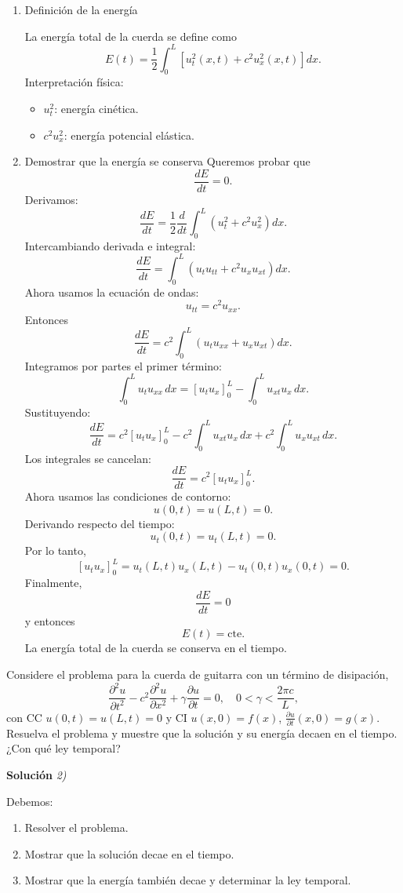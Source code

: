 \documentclass[11pt,spanish]{article}
\newcounter{problema}
\newcommand{\prob}{\stepcounter{problema} \vspace{.5cm} \noindent{\bf Problema \arabic{problema}: }}
\begin{document}
\begin{enumerate}
\item Definición de la energía

La energía total de la cuerda se define como
$$
E(t)
=
\frac12
\int_0^L
\left[
u_t^2(x,t)
+
c^2 u_x^2(x,t)
\right]
dx.
$$
Interpretación física:
\begin{itemize}
\item $u_t^2$: energía cinética.
\item $c^2 u_x^2$: energía potencial elástica.
\end{itemize}

\item Demostrar que la energía se conserva
Queremos probar que
$$
\frac{dE}{dt}=0.
$$
Derivamos:
$$
\frac{dE}{dt}
=
\frac12
\frac{d}{dt}
\int_0^L
\left(
u_t^2+c^2u_x^2
\right)dx.
$$
Intercambiando derivada e integral:
$$
\frac{dE}{dt}
=
\int_0^L
\left(
u_tu_{tt}
+
c^2u_xu_{xt}
\right)dx.
$$
Ahora usamos la ecuación de ondas:
$$
u_{tt}=c^2u_{xx}.
$$
Entonces
$$
\frac{dE}{dt}
=
c^2
\int_0^L
\left(
u_tu_{xx}
+
u_xu_{xt}
\right)dx.
$$
Integramos por partes el primer término:
$$
\int_0^L u_tu_{xx}\,dx
=
\left[
u_tu_x
\right]_0^L
-
\int_0^L u_{xt}u_x\,dx.
$$
Sustituyendo:
$$
\frac{dE}{dt}
=
c^2
\left[
u_tu_x
\right]_0^L
-
c^2
\int_0^L u_{xt}u_x\,dx
+
c^2
\int_0^L u_xu_{xt}\,dx.
$$
Los integrales se cancelan:
$$
\frac{dE}{dt}
=
c^2
\left[
u_tu_x
\right]_0^L.
$$
Ahora usamos las condiciones de contorno:
$$
u(0,t)=u(L,t)=0.
$$
Derivando respecto del tiempo:
$$
u_t(0,t)=u_t(L,t)=0.
$$
Por lo tanto,
$$
\left[
u_tu_x
\right]_0^L
=
u_t(L,t)u_x(L,t)
- 
u_t(0,t)u_x(0,t)
=
0.
$$
Finalmente,
$$
\boxed{
\frac{dE}{dt}=0
}
$$
y entonces
$$
\boxed{
E(t)=\text{cte.}
}
$$
La energía total de la cuerda se conserva en el tiempo.
\end{enumerate}




\prob Considere el problema para la cuerda de guitarra con un término de disipación,
\[
\frac{\partial^2 u}{\partial t^2} - c^2 \frac{\partial^2 u}{\partial x^2} + \gamma \frac{\partial u}{\partial t} = 0, \quad 0<\gamma<\frac{2\pi c}{L},
\]
con CC \(u(0,t)=u(L,t)=0\) y CI \(u(x,0)=f(x)\), \(\frac{\partial u}{\partial t}(x,0)=g(x)\). Resuelva el problema y muestre que la solución y su energía decaen en el tiempo. ¿Con qué ley temporal?

\vspace{0.5cm}
{\bf Soluci\'on }{\em 2)}
\vspace{0.5cm}

Debemos:
\begin{enumerate}
\item Resolver el problema.
\item Mostrar que la solución decae en el tiempo.
\item Mostrar que la energía también decae y determinar la ley temporal.
\end{enumerate}
\end{document}
